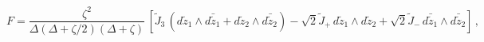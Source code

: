 \begin{equation}
F=\frac{\zeta^2}{\Delta (\Delta +\zeta /2)
(\Delta  +\zeta)} \,\left[ \tilde{J}_3\,
( d\tilde{z}_1\wedge d\bar{\tilde{z}}_1 
+d\tilde{z}_2\wedge d\bar{\tilde{z}}_2)
 -\sqrt{2} \tilde{J}_{+}\, d\tilde{z}_1\wedge d\tilde{z}_2 
+\sqrt{2}\tilde{J}_{-}\, 
 d\bar{\tilde{z}}_1\wedge d\bar{\tilde{z}}_2 \right]\,,\label{eq:4.1.21}
\end{equation} 

